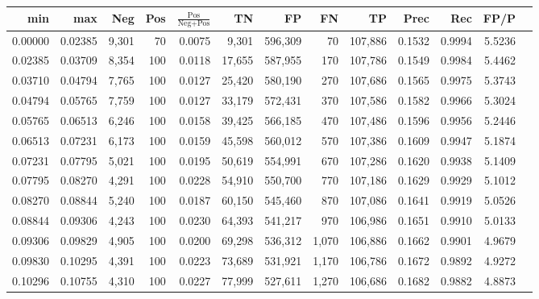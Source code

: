 \begin{tabular}{rrrrrrrrrrrrr}
\toprule
    min &     max &   Neg & Pos & $\frac{\text{Pos}}{\text{Neg}+\text{Pos}}$ &      TN &      FP &      FN &      TP &   Prec &    Rec &   FP/P \\
\midrule
0.00000 & 0.02385 & 9,301 &  70 &                                     0.0075 &   9,301 & 596,309 &      70 & 107,886 & 0.1532 & 0.9994 & 5.5236 \\
0.02385 & 0.03709 & 8,354 & 100 &                                     0.0118 &  17,655 & 587,955 &     170 & 107,786 & 0.1549 & 0.9984 & 5.4462 \\
0.03710 & 0.04794 & 7,765 & 100 &                                     0.0127 &  25,420 & 580,190 &     270 & 107,686 & 0.1565 & 0.9975 & 5.3743 \\
0.04794 & 0.05765 & 7,759 & 100 &                                     0.0127 &  33,179 & 572,431 &     370 & 107,586 & 0.1582 & 0.9966 & 5.3024 \\
0.05765 & 0.06513 & 6,246 & 100 &                                     0.0158 &  39,425 & 566,185 &     470 & 107,486 & 0.1596 & 0.9956 & 5.2446 \\
0.06513 & 0.07231 & 6,173 & 100 &                                     0.0159 &  45,598 & 560,012 &     570 & 107,386 & 0.1609 & 0.9947 & 5.1874 \\
0.07231 & 0.07795 & 5,021 & 100 &                                     0.0195 &  50,619 & 554,991 &     670 & 107,286 & 0.1620 & 0.9938 & 5.1409 \\
0.07795 & 0.08270 & 4,291 & 100 &                                     0.0228 &  54,910 & 550,700 &     770 & 107,186 & 0.1629 & 0.9929 & 5.1012 \\
0.08270 & 0.08844 & 5,240 & 100 &                                     0.0187 &  60,150 & 545,460 &     870 & 107,086 & 0.1641 & 0.9919 & 5.0526 \\
0.08844 & 0.09306 & 4,243 & 100 &                                     0.0230 &  64,393 & 541,217 &     970 & 106,986 & 0.1651 & 0.9910 & 5.0133 \\
0.09306 & 0.09829 & 4,905 & 100 &                                     0.0200 &  69,298 & 536,312 &   1,070 & 106,886 & 0.1662 & 0.9901 & 4.9679 \\
0.09830 & 0.10295 & 4,391 & 100 &                                     0.0223 &  73,689 & 531,921 &   1,170 & 106,786 & 0.1672 & 0.9892 & 4.9272 \\
0.10296 & 0.10755 & 4,310 & 100 &                                     0.0227 &  77,999 & 527,611 &   1,270 & 106,686 & 0.1682 & 0.9882 & 4.8873 \\

\end{tabular}
